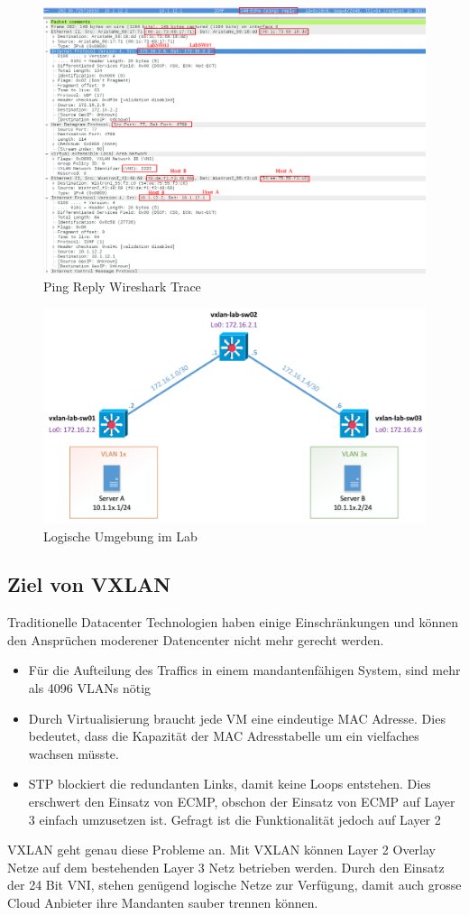 \begin{figure}[H]
	\centering
	\includegraphics[width=0.8\linewidth]{images/ping_replay}
	\caption{Ping Reply Wireshark Trace}
	\label{fig:pingreply}
\end{figure}

\begin{figure}[H]
	\centering
	\includegraphics[width=0.6\linewidth]{images/vxlan_logical}
	\caption{Logische Umgebung im Lab}
	\label{fig:vxlanlogical}
\end{figure}
\newpage

\subsection{Ziel von VXLAN}
Traditionelle Datacenter Technologien haben einige Einschränkungen und können den Ansprüchen moderener Datencenter nicht mehr gerecht werden. 
\begin{itemize}
	\item Für die Aufteilung des Traffics in einem mandantenfähigen System, sind mehr als 4096 VLANs nötig
	\item Durch Virtualisierung braucht jede VM eine eindeutige MAC Adresse. Dies bedeutet, dass die Kapazität der MAC Adresstabelle um ein vielfaches wachsen müsste. 
	\item STP blockiert die redundanten Links, damit keine Loops entstehen. Dies erschwert den Einsatz von ECMP, obschon der Einsatz von ECMP auf Layer 3 einfach umzusetzen ist. Gefragt ist die Funktionalität jedoch auf Layer 2
\end{itemize}
VXLAN geht genau diese Probleme an. Mit VXLAN können Layer 2 Overlay Netze auf dem bestehenden Layer 3 Netz betrieben werden. Durch den Einsatz der 24 Bit VNI, stehen genügend logische Netze zur Verfügung, damit auch grosse Cloud Anbieter ihre Mandanten sauber trennen können. 


